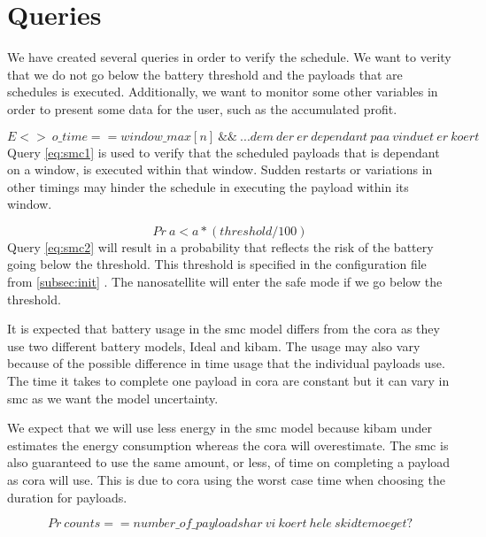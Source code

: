 \section{Queries}\label{sec:queries}
We have created several queries in order to verify the schedule. We want to verity that we do not go below the battery threshold and the payloads that are schedules is executed. Additionally, we want to monitor some other variables in order to present some data for the user, such as the accumulated profit.

\begin{equation} \label{eq:smc1}
	E<>\ o\_time == window\_max[n]\ \&\&\ ... dem\ der\ er\ dependant\ paa\ vinduet\ er\ koert
\end{equation}
Query \ref{eq:smc1} is used to verify that the scheduled payloads that is dependant on a window, is executed within that window. Sudden restarts or variations in other timings may hinder the schedule in executing the payload within its window. 

\begin{equation} \label{eq:smc2}
	Pr\ a < a*(threshold/100)
\end{equation}
Query \ref{eq:smc2} will result in a probability that reflects the risk of the battery going below the threshold. This threshold is specified in the configuration file from \cref{subsec:init} . The nanosatellite will enter the safe mode if we go below the threshold.

It is expected that battery usage in the \gls{smc} model differs from the \gls{cora} as they use two  different battery models, Ideal and \gls{kibam}. The usage may also vary because of the possible difference in time usage that the individual payloads use. The time it takes to complete one payload in \gls{cora} are constant but it can vary in \gls{smc} as we want the model uncertainty.

We expect that we will use less energy in the \gls{smc} model because \gls{kibam} under estimates the energy consumption whereas the  \gls{cora} will overestimate. The \gls{smc} is also guaranteed to use the same amount, or less, of time on completing a payload as \gls{cora} will use. This is due to \gls{cora} using the worst case time when choosing the duration for payloads.

\begin{equation} \label{eq:smc3}
	Pr\ counts == number\_of\_payloads har\ vi\ koert\ hele\ skidtemoeget?
\end{equation}


